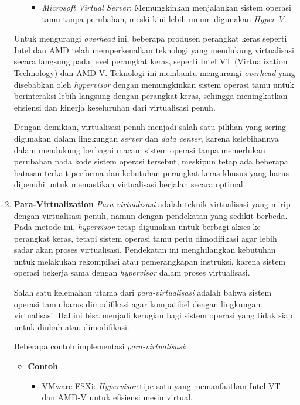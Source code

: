 \documentclass[12pt]{article}
\begin{document}
\begin{enumerate}
\begin{itemize}
\begin{itemize}
            \item \textit{Microsoft Virtual Server}: Memungkinkan menjalankan sistem operasi tamu tanpa perubahan, meski kini lebih umum digunakan \textit{Hyper-V}.
        \end{itemize}
    \end{itemize}
    Untuk mengurangi \textit{overhead} ini, beberapa produsen perangkat keras seperti Intel dan AMD telah memperkenalkan teknologi yang mendukung virtualisasi secara langsung pada level perangkat keras, seperti Intel VT (Virtualization Technology) dan AMD-V. Teknologi ini membantu mengurangi \textit{overhead} yang disebabkan oleh \textit{hypervisor} dengan memungkinkan sistem operasi tamu untuk berinteraksi lebih langsung dengan perangkat keras, sehingga meningkatkan efisiensi dan kinerja keseluruhan dari virtualisasi penuh.
    
    \par Dengan demikian, virtualisasi penuh menjadi salah satu pilihan yang sering digunakan dalam lingkungan \textit{server} dan \textit{data center}, karena kelebihannya dalam mendukung berbagai macam sistem operasi tanpa memerlukan perubahan pada kode sistem operasi tersebut, meskipun tetap ada beberapa batasan terkait performa dan kebutuhan perangkat keras khusus yang harus dipenuhi untuk memastikan virtualisasi berjalan secara optimal.

    \item \textbf{Para-Virtualization}
    \newline \textit{Para-virtualisasi} adalah teknik virtualisasi yang mirip dengan virtualisasi penuh, namun dengan pendekatan yang sedikit berbeda. Pada metode ini, \textit{hypervisor} tetap digunakan untuk berbagi akses ke perangkat keras, tetapi sistem operasi tamu perlu dimodifikasi agar lebih sadar akan proses virtualisasi. Pendekatan ini menghilangkan kebutuhan untuk melakukan rekompilasi atau pemerangkapan instruksi, karena sistem operasi bekerja sama dengan \textit{hypervisor} dalam proses virtualisasi.

    \par Salah satu kelemahan utama dari \textit{para-virtualisasi} adalah bahwa sistem operasi tamu harus dimodifikasi agar kompatibel dengan lingkungan virtualisasi. Hal ini bisa menjadi kerugian bagi sistem operasi yang tidak siap untuk diubah atau dimodifikasi. 
    
    \par Beberapa contoh implementasi \textit{para-virtualisasi}:
    \begin{itemize}
        \item \textbf{Contoh}
        \begin{itemize}
            \item VMware ESXi: \textit{Hypervisor} tipe satu yang memanfaatkan Intel VT dan AMD-V untuk efisiensi mesin virtual.


\end{itemize}
\end{itemize}
\end{enumerate}
\end{document}
